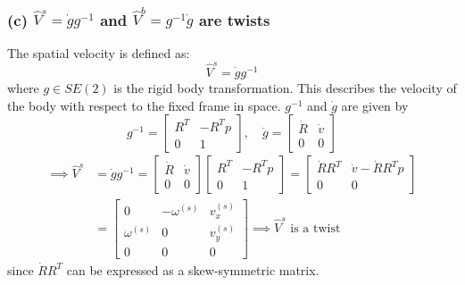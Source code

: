 \clearpage
\subsubsection*{(c) \( \hat{V}^{s} = \dot{g} g^{-1} \) and \( \hat{V}^{b} = g^{-1} \dot{g} \) are twists}

The spatial velocity is defined as:
\[
    \hat{V}^{s} = \dot{g} g^{-1}
\]
where \( g \in SE(2) \) is the rigid body transformation.
This describes the velocity of the body with respect to the fixed frame in space.
\( g^{-1} \) and \( \dot g \) are given by
\begin{equation*}
    g^{-1} = \begin{bmatrix}
        R^T & -R^T p \\
        0   & 1
    \end{bmatrix},
    \quad
    \dot{g} = \begin{bmatrix}
        \dot R & \dot v \\
        0      & 0
    \end{bmatrix}
\end{equation*}
\begin{align*}
    \implies
    \hat{V}^{s}
     & =
    \dot{g} g^{-1}
    =
    \begin{bmatrix}
        \dot R & \dot v \\
        0      & 0
    \end{bmatrix}
    \begin{bmatrix}
        R^T & -R^T p \\
        0   & 1
    \end{bmatrix}
    =
    \begin{bmatrix}
        \dot R R^T & \dot v - \dot R R^T p \\
        0          & 0
    \end{bmatrix}
    \\ & =
    \begin{bmatrix}
        0            & -\omega^{(s)} & v_x^{(s)} \\
        \omega^{(s)} & 0             & v_y^{(s)} \\
        0            & 0             & 0
    \end{bmatrix}
    \implies
    \hat{V}^{s} \text{ is a twist}
\end{align*}
since \( \dot R R^T \) can be expressed as a skew-symmetric matrix.

